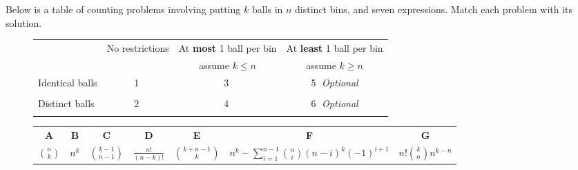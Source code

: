 \documentclass[12pt,letterpaper]{article}
\begin{document}
Below is a table of counting problems involving putting $k$ balls in $n$ distinct bins, and seven expressions. Match each problem with its solution.
\vspace{0.5cm}
\begin{figure}[h]
    \centering
    \begin{tabular}{p{2.5cm}|c|c|c}
    & No restrictions & At \textbf{most} 1 ball per bin & At \textbf{least} 1 ball per bin  \\
    & & \small assume $k \leq n$ & \small assume $k \geq n$\\
    \hline
    Identical balls & \small \textcircled{1}& \small \textcircled{3} & \small \textcircled{5} \textit{Optional} \\
    &  &\\
    \hline
    Distinct balls &\small \textcircled{2} &\small \textcircled{4} & \small \textcircled{6} \textit{Optional} \\
    & &\\
\end{tabular}
\begin{tabular}{ccccccc}
    \\
    \textbf{A} & \textbf{B} & \textbf{C} & \textbf{D} & \textbf{E} & \textbf{F} & \textbf{G}\\
    \large $\binom{n}{k}$ & \large $n^k$ & \large $\binom{k-1}{n-1}$ & \large $\frac{n!}{(n-k)!}$ & \large $\binom{k+n-1}{k}$ & \large $n^k-\sum_{i=1}^{n-1} \binom{n}{i} (n-i)^k (-1)^{i+1}$& $n!{{k}\choose{n}}n^{k-n}$ \\
\end{tabular}
\end{figure}
\end{document}

